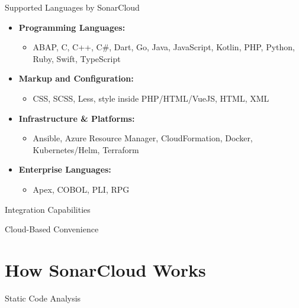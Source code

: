 \documentclass{beamer}
\begin{document}
\begin{frame}{Supported Languages by SonarCloud}
  \begin{itemize}
      \item \textbf{Programming Languages:}
      \begin{itemize}
          \item ABAP, C, C++, C\#, Dart, Go, Java, JavaScript, Kotlin, PHP, Python, Ruby, Swift, TypeScript
      \end{itemize}
      \vspace*{0.5em}
        \item \textbf{Markup and Configuration:}
      \begin{itemize}
        \item CSS, SCSS, Less, style inside PHP/HTML/VueJS, HTML, XML
      \end{itemize}
      \vspace*{0.5em}
      \item \textbf{Infrastructure \& Platforms:}
      \begin{itemize}
        \item Ansible, Azure Resource Manager, CloudFormation, Docker, Kubernetes/Helm, Terraform
      \end{itemize}
      \vspace*{0.5em}
      \item \textbf{Enterprise Languages:}
      \begin{itemize}
        \item Apex, COBOL, PLI, RPG
      \end{itemize}
  \end{itemize}
\end{frame}

\begin{frame}{Integration Capabilities}
  
\end{frame}

\begin{frame}{Cloud-Based Convenience}

\end{frame}


\section[How SonarCloud Works]{How SonarCloud Works}

\begin{frame}{Static Code Analysis}
  
\end{frame}
\end{document}
